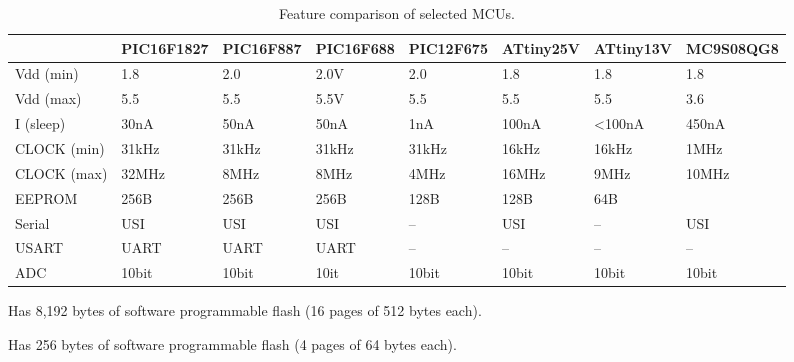 \begin{table}
\begin{centering}
\begin{tabular}{|l|l|l|l|l|l|l|l|}
\cline{2-8}
\multicolumn{1}{l|}{} & PIC16F1827  & PIC16F887  & PIC16F688  & PIC12F675  & ATtiny25V  & ATtiny13V  & MC9S08QG8 \tabularnewline
\hline
Vdd (min)  & 1.8  & 2.0  & 2.0V  & 2.0  & 1.8  & 1.8  & 1.8 \tabularnewline
Vdd (max)  & 5.5  & 5.5  & 5.5V  & 5.5  & 5.5  & 5.5  & 3.6 \tabularnewline
I (sleep)  & 30nA  & 50nA  & 50nA  & 1nA  & 100nA & <100nA & 450nA\tabularnewline
CLOCK (min)  & 31kHz  & 31kHz & 31kHz & 31kHz & 16kHz & 16kHz & 1MHz \tabularnewline
CLOCK (max)  & 32MHz  & 8MHz  & 8MHz  & 4MHz  & 16MHz & 9MHz  & 10MHz\tabularnewline
EEPROM  & 256B  & 256B  & 256B  & 128B  & 128B  & 64B  & \dag{}\tabularnewline
Serial  & USI  & USI  & USI  & --  & USI  & --  & USI \tabularnewline
USART  & UART  & UART  & UART  & --  & --  & --  & -- \tabularnewline
ADC  & 10bit  & 10bit & 10it  & 10bit & 10bit & 10bit & 10bit\tabularnewline
\hline
\end{tabular}
\par\end{centering}

\begin{centering}
\dag Has 8,192 bytes of software programmable flash (16 pages of 512
bytes each).
\par\end{centering}

\begin{centering}
\ddag Has 256 bytes of software programmable flash (4 pages of 64
bytes each).
\par\end{centering}

\centering{}\protect\caption{\label{tab:MCUfeaturecomparison} Feature comparison of selected MCUs.}
\end{table}






